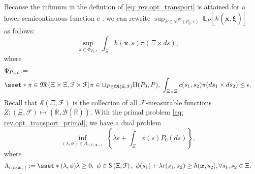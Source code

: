 \documentclass[final,onefignum,onetabnum]{class}
\newcommand{\ee}[2]{\mathbb{E}_{#1} \left[ #2 \right]}
\newcommand{\bs}[1]{\boldsymbol{#1}} %
\newcommand{\Bs}[1]{\mathbb{#1}} %
\newcommand{\Ts}[1]{\mathbbmtt{#1}} %
\newcommand{\Cs}[1]{\mathcal{#1}} %
\newcommand{\Fs}[1]{\mathfrak{#1}} %
\newcommand{\txi}{\tilde{\bs{\xi}}}
\newcommand{\ol}[1]{\overline{#1}}
\newcommand{\measurespace}{\left( \Xi, \Cs{F} \right)}
\newcommand{\promeasurespace}{\left( \Xi \times \Xi, \Cs{F} \times \Cs{F} \right)}
\begin{document}
Because the infimum in the defintion of \eqref{eq: rev.opt_transport} is attained for a lower semicontinuous function $c$ \cite{villani2008,rachev1998}, we can rewrite $\sup_{P \in \Cs{P}^{\text{W}}(P_{0}; \epsilon)} \ \ee{P}{h(\bs{x},\txi)}$ as follows:
\begin{equation}
    \label{eq: rev.opt_transport_primal}
    \sup_{\pi \in \Phi_{P_{0}, \epsilon} }  \ \int_{\Xi} h(\bs{x},s) \pi(\Xi \times d s), 
\end{equation}
where 
\begin{equation*}
    \begin{split}
        & \Phi_{P_{0}, \epsilon}  := \\ 
        &  {} \sset*{ \pi \in \Fs{M}\promeasurespace}{\pi \in \cup_{P \in \Fs{M}\measurespace } \Pi(P_{0}, P), \; \int_{\Xi\times \Xi} c(s_1,s_2) \pi(d s_1\times d s_2) \le \epsilon}.
    \end{split}    
\end{equation*}
Recall that $\Cs{S}\measurespace$ is the collection of all $\Cs{F}$-measurable functions $Z: \measurespace \mapsto (\ol{\Bs{R}}, \Cs{B}(\overline{\Bs{R}}))$. 
With the primal problem \eqref{eq: rev.opt_transport_primal}, we have a dual problem 
\begin{equation}
    \label{eq: rev.opt_transport_dual}
    \inf_{(\lambda, \phi) \in \Lambda_{c,h(\bs{x}, \cdot)} } \  \left\lbrace  \lambda \epsilon +  \int_{\Xi} \phi(s)  P_{0}(ds) \right\rbrace ,
\end{equation}
where 
$$\Lambda_{c,h(\bs{x}, \cdot)}:=\sset*{(\lambda, \phi)}{\lambda \ge 0, \ \phi \in \Cs{S}\measurespace, \ \phi(s_{1}) + \lambda c(s_1,s_2) \ge h(\bs{x}, s_{2}), \forall  s_1,s_2 \in \Xi}.$$
\end{document}
